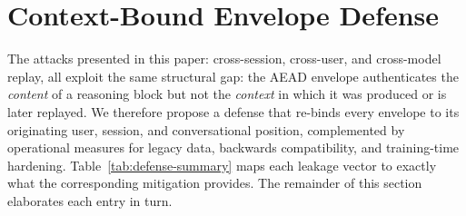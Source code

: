 
\section{Context-Bound Envelope Defense}
\label{app:defense-proposal}

 The attacks presented in this paper: cross-session,
cross-user, and cross-model replay, all exploit the same structural gap:
the AEAD envelope authenticates the \emph{content} of a reasoning block
but not the \emph{context} in which it was produced or is later replayed.
We therefore propose a defense that re-binds every envelope to its
originating user, session, and conversational position, complemented by
operational measures for legacy data, backwards compatibility, and
training-time hardening. Table~\ref{tab:defense-summary} maps each leakage vector to exactly
what the corresponding mitigation provides. The remainder of
this section elaborates each entry in turn.

